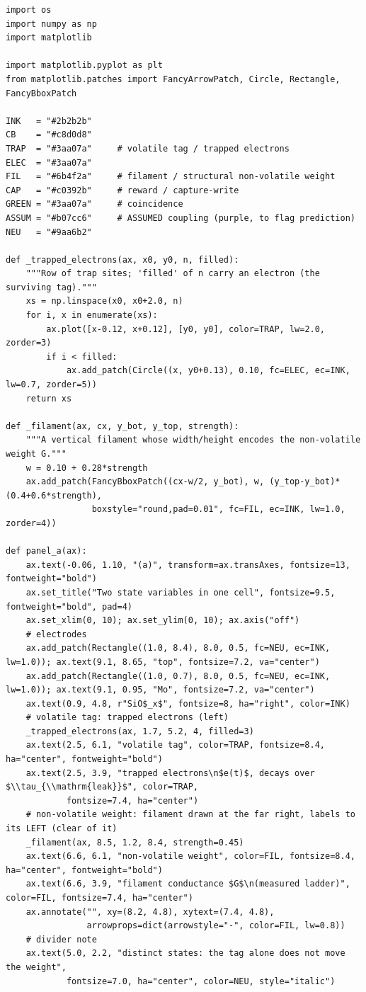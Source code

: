 \begin{lstlisting}[caption={schematics.ipynb code cell 3},label={lst:mrl-nb-schematics-3}]
import os
import numpy as np
import matplotlib

import matplotlib.pyplot as plt
from matplotlib.patches import FancyArrowPatch, Circle, Rectangle, FancyBboxPatch

INK   = "#2b2b2b"
CB    = "#c8d0d8"
TRAP  = "#3aa07a"     # volatile tag / trapped electrons
ELEC  = "#3aa07a"
FIL   = "#6b4f2a"     # filament / structural non-volatile weight
CAP   = "#c0392b"     # reward / capture-write
GREEN = "#3aa07a"     # coincidence
ASSUM = "#b07cc6"     # ASSUMED coupling (purple, to flag prediction)
NEU   = "#9aa6b2"

def _trapped_electrons(ax, x0, y0, n, filled):
    """Row of trap sites; 'filled' of n carry an electron (the surviving tag)."""
    xs = np.linspace(x0, x0+2.0, n)
    for i, x in enumerate(xs):
        ax.plot([x-0.12, x+0.12], [y0, y0], color=TRAP, lw=2.0, zorder=3)
        if i < filled:
            ax.add_patch(Circle((x, y0+0.13), 0.10, fc=ELEC, ec=INK, lw=0.7, zorder=5))
    return xs

def _filament(ax, cx, y_bot, y_top, strength):
    """A vertical filament whose width/height encodes the non-volatile weight G."""
    w = 0.10 + 0.28*strength
    ax.add_patch(FancyBboxPatch((cx-w/2, y_bot), w, (y_top-y_bot)*(0.4+0.6*strength),
                 boxstyle="round,pad=0.01", fc=FIL, ec=INK, lw=1.0, zorder=4))

def panel_a(ax):
    ax.text(-0.06, 1.10, "(a)", transform=ax.transAxes, fontsize=13, fontweight="bold")
    ax.set_title("Two state variables in one cell", fontsize=9.5, fontweight="bold", pad=4)
    ax.set_xlim(0, 10); ax.set_ylim(0, 10); ax.axis("off")
    # electrodes
    ax.add_patch(Rectangle((1.0, 8.4), 8.0, 0.5, fc=NEU, ec=INK, lw=1.0)); ax.text(9.1, 8.65, "top", fontsize=7.2, va="center")
    ax.add_patch(Rectangle((1.0, 0.7), 8.0, 0.5, fc=NEU, ec=INK, lw=1.0)); ax.text(9.1, 0.95, "Mo", fontsize=7.2, va="center")
    ax.text(0.9, 4.8, r"SiO$_x$", fontsize=8, ha="right", color=INK)
    # volatile tag: trapped electrons (left)
    _trapped_electrons(ax, 1.7, 5.2, 4, filled=3)
    ax.text(2.5, 6.1, "volatile tag", color=TRAP, fontsize=8.4, ha="center", fontweight="bold")
    ax.text(2.5, 3.9, "trapped electrons\n$e(t)$, decays over $\\tau_{\\mathrm{leak}}$", color=TRAP,
            fontsize=7.4, ha="center")
    # non-volatile weight: filament drawn at the far right, labels to its LEFT (clear of it)
    _filament(ax, 8.5, 1.2, 8.4, strength=0.45)
    ax.text(6.6, 6.1, "non-volatile weight", color=FIL, fontsize=8.4, ha="center", fontweight="bold")
    ax.text(6.6, 3.9, "filament conductance $G$\n(measured ladder)", color=FIL, fontsize=7.4, ha="center")
    ax.annotate("", xy=(8.2, 4.8), xytext=(7.4, 4.8),
                arrowprops=dict(arrowstyle="-", color=FIL, lw=0.8))
    # divider note
    ax.text(5.0, 2.2, "distinct states: the tag alone does not move the weight",
            fontsize=7.0, ha="center", color=NEU, style="italic")


\end{lstlisting}
